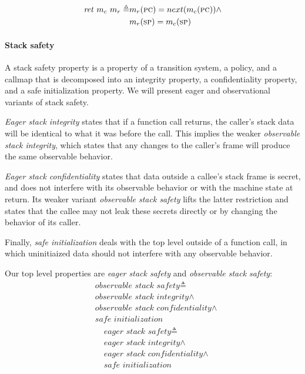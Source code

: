 \documentclass[conference]{IEEEtran}
\begin{document}
    \[\begin{split}
      \mathit{ret}\ m_c\ m_r \triangleq & m_r(\textsc{pc}) = next(m_c(\textsc{pc})) \land \\
                                        & m_r(\textsc{sp}) = m_c(\textsc{sp})
    \end{split}\]

    
    \paragraph*{Stack safety}
  
    A stack safety property is a property of a transition system, a policy, and a callmap
    that is decomposed into an integrity property, a confidentiality property, and a safe
    initialization property. We will present eager and observational variants of stack safety.

    {\it Eager stack integrity} states that if a function call returns, the caller's stack data
    will be identical to what it was before the call. This implies the weaker {\it observable
    stack integrity}, which states that any changes to the caller's frame will produce the same
    observable behavior.

    {\it Eager stack confidentiality} states that data outside a callee's stack frame is secret,
    and does not interfere with its observable behavior or with the machine state at return. Its
    weaker variant {\it observable stack safety} lifts the latter restriction and states that
    the callee may not leak these secrets directly or by changing the behavior of its caller.

    Finally, {\it safe initialization} deals with the top level outside of a function call, in
    which uninitiaized data should not interfere with any observable behavior.


    Our top level properties are {\it eager stack safety} and {\it observable stack safety}:
    \[\begin{split}
      & \textit{observable stack safety} \triangleq \\
      & \textit{observable stack integrity} \land \\
      & \textit{observable stack confidentiality} \land \\
      & \textit{safe initialization}
    \end{split}\]
    \[\begin{split}
      & \textit{eager stack safety} \triangleq \\
      & \textit{eager stack integrity} \land \\
      & \textit{eager stack confidentiality} \land \\
      & \textit{safe initialization}
    \end{split}\]
\end{document}
